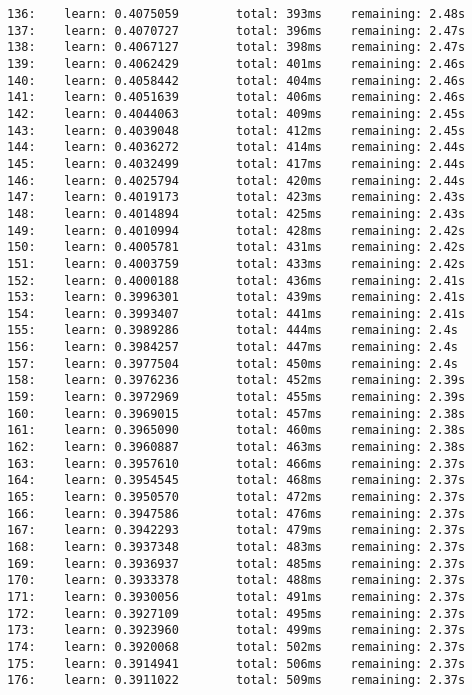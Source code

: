 \documentclass[11pt]{article}
\begin{document}
\begin{Verbatim}[commandchars=\\\{\}]
136:    learn: 0.4075059        total: 393ms    remaining: 2.48s
137:    learn: 0.4070727        total: 396ms    remaining: 2.47s
138:    learn: 0.4067127        total: 398ms    remaining: 2.47s
139:    learn: 0.4062429        total: 401ms    remaining: 2.46s
140:    learn: 0.4058442        total: 404ms    remaining: 2.46s
141:    learn: 0.4051639        total: 406ms    remaining: 2.46s
142:    learn: 0.4044063        total: 409ms    remaining: 2.45s
143:    learn: 0.4039048        total: 412ms    remaining: 2.45s
144:    learn: 0.4036272        total: 414ms    remaining: 2.44s
145:    learn: 0.4032499        total: 417ms    remaining: 2.44s
146:    learn: 0.4025794        total: 420ms    remaining: 2.44s
147:    learn: 0.4019173        total: 423ms    remaining: 2.43s
148:    learn: 0.4014894        total: 425ms    remaining: 2.43s
149:    learn: 0.4010994        total: 428ms    remaining: 2.42s
150:    learn: 0.4005781        total: 431ms    remaining: 2.42s
151:    learn: 0.4003759        total: 433ms    remaining: 2.42s
152:    learn: 0.4000188        total: 436ms    remaining: 2.41s
153:    learn: 0.3996301        total: 439ms    remaining: 2.41s
154:    learn: 0.3993407        total: 441ms    remaining: 2.41s
155:    learn: 0.3989286        total: 444ms    remaining: 2.4s
156:    learn: 0.3984257        total: 447ms    remaining: 2.4s
157:    learn: 0.3977504        total: 450ms    remaining: 2.4s
158:    learn: 0.3976236        total: 452ms    remaining: 2.39s
159:    learn: 0.3972969        total: 455ms    remaining: 2.39s
160:    learn: 0.3969015        total: 457ms    remaining: 2.38s
161:    learn: 0.3965090        total: 460ms    remaining: 2.38s
162:    learn: 0.3960887        total: 463ms    remaining: 2.38s
163:    learn: 0.3957610        total: 466ms    remaining: 2.37s
164:    learn: 0.3954545        total: 468ms    remaining: 2.37s
165:    learn: 0.3950570        total: 472ms    remaining: 2.37s
166:    learn: 0.3947586        total: 476ms    remaining: 2.37s
167:    learn: 0.3942293        total: 479ms    remaining: 2.37s
168:    learn: 0.3937348        total: 483ms    remaining: 2.37s
169:    learn: 0.3936937        total: 485ms    remaining: 2.37s
170:    learn: 0.3933378        total: 488ms    remaining: 2.37s
171:    learn: 0.3930056        total: 491ms    remaining: 2.37s
172:    learn: 0.3927109        total: 495ms    remaining: 2.37s
173:    learn: 0.3923960        total: 499ms    remaining: 2.37s
174:    learn: 0.3920068        total: 502ms    remaining: 2.37s
175:    learn: 0.3914941        total: 506ms    remaining: 2.37s
176:    learn: 0.3911022        total: 509ms    remaining: 2.37s

\end{Verbatim}
\end{document}
